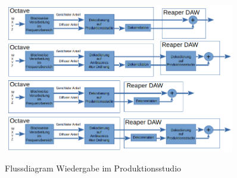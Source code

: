 \begin{figure}[!ht]
  \centering
  \includegraphics[width=0.9\textwidth]{aufbau/plots/algos.png}
  \label{fig:algos}
  \caption{Flussdiagram Wiedergabe im Produktionsstudio}
\end{figure}